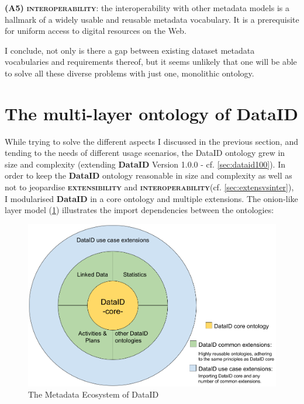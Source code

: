 \documentclass[a4paper,english,twoside,BCOR1.5cm,headsepline,DIV12,appendixprefix,final,12pt]{scrbook}
\newcommand{\extensibility}{{\ttfamily\scshape\bfseries extensibility}\xspace}
\newcommand{\interoperability}{{\ttfamily\scshape\bfseries interoperability}\xspace}
\newcommand{\dataid}{{\ttfamily\bfseries DataID}\xspace}
\begin{document}
\textbf{(A5)} \interoperability: the interoperability with other metadata models is a hallmark of a widely usable and reusable metadata vocabulary. It is a prerequisite for uniform access to digital resources on the Web.

I conclude, not only is there a gap between existing dataset metadata vocabularies and requirements thereof, but it seems unlikely that one will be able to solve all these diverse problems with just one, monolithic ontology.



\section{The multi-layer ontology of DataID} 
\label{sec:multilayer}

While trying to solve the different aspects I discussed in the previous section, and tending to the needs of different usage scenarios, the DataID ontology grew in size and complexity (extending \dataid Version 1.0.0 - cf. \cref{sec:dataid100}).
In order to keep the \dataid ontology reasonable in size and complexity as well as not to jeopardise \extensibility and \interoperability (cf. \cref{sec:extensvsinter}), I modularised \dataid in a core ontology and multiple extensions. The onion-like layer model (\cref{fig:onion}) illustrates the import dependencies between the ontologies: 

\begin{figure}[!htbp]
\centering
  \includegraphics[width=\textwidth]{images/DataIDonion.png}
  \caption{The Metadata Ecosystem of DataID}
  \label{fig:onion}
\end{figure}
\end{document}
